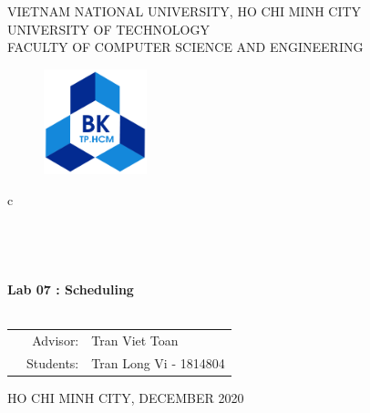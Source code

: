 \documentclass[13pt,a4paper]{article}
\begin{document}
	
	\begin{titlepage}
		\begin{center}
			VIETNAM NATIONAL UNIVERSITY, HO CHI MINH CITY \\
			UNIVERSITY OF TECHNOLOGY \\
			FACULTY OF COMPUTER SCIENCE AND ENGINEERING
		\end{center}
		
		\vspace{1cm}
		
		\begin{figure}[h!]
			\begin{center}
				\includegraphics[width=3cm]{hcmut.png}
			\end{center}
		\end{figure}
		
		\vspace{1cm}
		
		\begin{center}
			\color{blue}
			\begin{tabular}{c}
				\\
				~~\\
				\hline
				\\
				\\
				\\
				\textbf{{\Huge Lab 07 : Scheduling}}\\
				\\
				\hline
			\end{tabular}
			\color{blue}
		\end{center}
		\vspace{1cm}
		
		\begin{table}[h]
			\color{blue}
			\begin{tabular}{rrl}
				\hspace{5 cm} & Advisor: & Tran Viet Toan\\
				& Students: & Tran Long Vi - 1814804 \\
			\end{tabular}
			\color{blue}
		\end{table}
		
		\vspace{4 cm}
		\begin{center}
			{\footnotesize\large HO CHI MINH CITY, DECEMBER 2020}
		\end{center}
	\end{titlepage}
	
\end{document}

